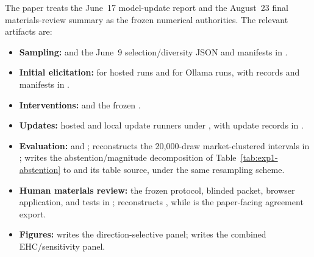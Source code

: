 The paper treats the June~17 model-update report and the August~23 final
materials-review summary as the frozen numerical authorities. The relevant
artifacts are:

\begin{itemize}
  \item \textbf{Sampling:}
         and the June~9
        selection/diversity JSON and manifests in
        .
  \item \textbf{Initial elicitation:}
         for hosted runs and
         for Ollama runs, with
        records and manifests in .
  \item \textbf{Interventions:}
         and the frozen
        .
  \item \textbf{Updates:}
        hosted and local update runners under , with
        update records in .
  \item \textbf{Evaluation:}
         and
        ;
        reconstructs the 20,000-draw market-clustered intervals in
        ;
         writes the
        abstention/magnitude decomposition of Table~\ref{tab:exp1-abstention} to
         and its
        table source, under the same resampling scheme.
  \item \textbf{Human materials review:}
        the frozen protocol, blinded packet, browser application, and tests in
        ;
         reconstructs
        , while
         is the paper-facing agreement
        export.
  \item \textbf{Figures:}
         writes the direction-selective panel;
         writes the combined
        EHC/sensitivity panel.
\end{itemize}


